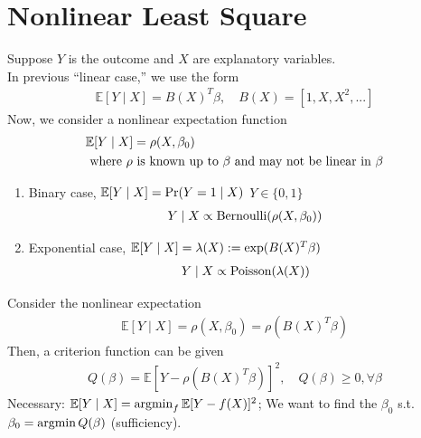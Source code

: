 \documentclass[11pt]{elegantbook}
\newcommand{\argmin}{\operatornamewithlimits{argmin}}
\begin{document}
\section{Nonlinear Least Square}
Suppose $Y$ is the outcome and $X$ are explanatory variables.\\
In previous ``linear case,'' we use the form
\begin{equation}
    \begin{aligned}
        \mathbb{E}[Y\mid X]=B(X)^T\beta,\quad B(X)=[1,X,X^2,...]
    \end{aligned}
    \nonumber
\end{equation}
Now, we consider a nonlinear expectation function
\begin{equation}
    \begin{aligned}
        &\mathbb{E}[Y\mid X]=\rho(X,\beta_0)\\ &\textnormal{ where $\rho$ is known up to $\beta$ and may not be linear in $\beta$}
    \end{aligned}
    \nonumber
\end{equation}
\begin{example}
    \begin{enumerate}
        \item Binary case, $\mathbb{E}[Y\mid X]=\textnormal{Pr}(Y=1\mid X)$ $Y\in\{0,1\}$
        \begin{equation}
            \begin{aligned}
                Y\mid X\propto \textnormal{Bernoulli}(\rho(X,\beta_0))
            \end{aligned}
            \nonumber
        \end{equation}
        \item Exponential case, $\mathbb{E}[Y\mid X]=\lambda(X):=\textnormal{exp}(B(X)^T\beta)$
        \begin{equation}
            \begin{aligned}
                Y\mid X\propto \textnormal{Poisson}(\lambda(X))
            \end{aligned}
            \nonumber
        \end{equation}
    \end{enumerate}
\end{example}

Consider the nonlinear expectation
\begin{equation}
    \begin{aligned}
        \mathbb{E}[Y\mid X]=\rho(X,\beta_0)=\rho(B(X)^T\beta)
    \end{aligned}
    \nonumber
\end{equation}
Then, a criterion function can be given
\begin{equation}
    \begin{aligned}
        Q(\beta)=\mathbb{E}[Y-\rho(B(X)^T\beta)]^2,\quad Q(\beta)\geq 0,\forall \beta
    \end{aligned}
    \nonumber
\end{equation}
Necessary: $\mathbb{E}[Y\mid X]=\argmin_f \mathbb{E}[Y-f(X)]^2$; We want to find the $\beta_0$ s.t. $\beta_0=\argmin Q(\beta)$ (sufficiency).
\end{document}
